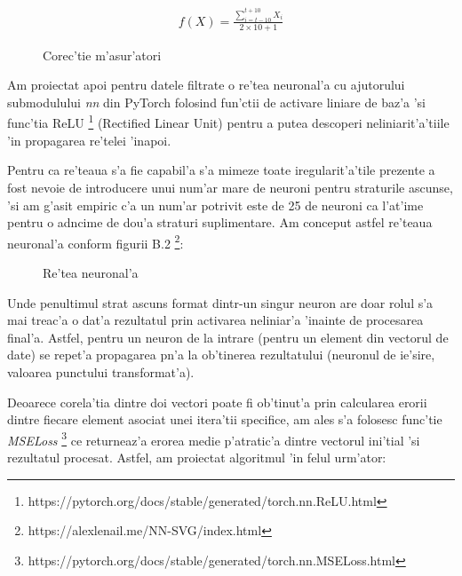 \begin{gather}
    f(X) = \frac{\sum_{i=t-10}^{t+10} X_i}{2 \times 10 + 1}
\end{gather}

\begin{figure}[h]
  \hspace*{-4cm}
  
  \caption{Corec'tie m'asur'atori}
\end{figure}

Am proiectat apoi pentru datele filtrate o re'tea neuronal'a cu ajutorului submodulului \textit{nn} din PyTorch folosind fun'ctii de activare liniare de baz'a 'si func'tia ReLU \footnote{https://pytorch.org/docs/stable/generated/torch.nn.ReLU.html} (Rectified Linear Unit) pentru a putea descoperi neliniarit'a'tiile 'in propagarea re'telei 'inapoi. 

\vspace{5px}

Pentru ca re'teaua s'a fie capabil'a s'a mimeze toate iregularit'a'tile prezente a fost nevoie de introducere unui num'ar mare de neuroni pentru straturile ascunse, 'si am g'asit empiric c'a un num'ar potrivit este de 25 de neuroni ca l'at'ime pentru o ad\ia ncime de dou'a straturi suplimentare. Am conceput astfel re'teaua neuronal'a conform figurii B.2 \footnote{https://alexlenail.me/NN-SVG/index.html}:

\begin{figure}[h]
\centering
  
  \caption{Re'tea neuronal'a}
\end{figure}

Unde penultimul strat ascuns format dintr-un singur neuron are doar rolul s'a mai treac'a o dat'a rezultatul prin activarea neliniar'a 'inainte de procesarea final'a. Astfel, pentru un neuron de la intrare (pentru un element din vectorul de date) se repet'a propagarea p\ia n'a la ob'tinerea rezultatului (neuronul de ie'sire, valoarea punctului transformat'a).

\vspace{5px}

Deoarece corela'tia dintre doi vectori poate fi ob'tinut'a prin calcularea erorii dintre fiecare element asociat unei itera'tii specifice, am ales s'a folosesc func'tie \textit{MSELoss} \footnote{https://pytorch.org/docs/stable/generated/torch.nn.MSELoss.html} ce returneaz'a erorea medie p'atratic'a dintre vectorul ini'tial 'si rezultatul procesat. Astfel, am proiectat algoritmul 'in felul urm'ator: 


